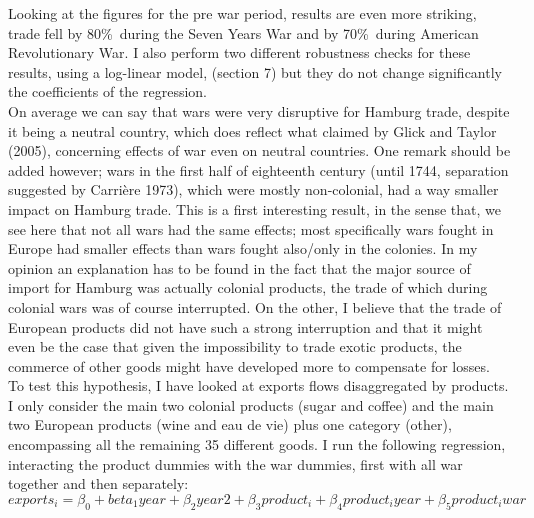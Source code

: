 \documentclass[12pt,a4paper,titlepage]{article}
\begin{document}
Looking at the figures for the pre war period, results are even more striking, trade fell by 80\%\ during the Seven Years War and by 70\%\ during American Revolutionary War. I also perform two different robustness checks for these results, using a log-linear model, (section 7) but they do not change significantly the coefficients of the regression. \\
On average we can say that wars were very disruptive for Hamburg trade, despite it being a neutral country, which does reflect what claimed by Glick and Taylor (2005), concerning effects of war even on neutral countries. One remark should be added however; wars in the first half of eighteenth century (until 1744, separation suggested by Carrière 1973), which were mostly non-colonial, had a way smaller impact on Hamburg trade. This is a first interesting result, in the sense that, we see here that not all wars had the same effects; most specifically wars fought in Europe had smaller effects than wars fought also/only in the colonies. In my opinion an explanation has to be found in the fact that the major source of import for Hamburg was actually colonial products, the trade of which during colonial wars was of course interrupted. On the other, I believe that the trade of European products did not have such a strong interruption and that it might even be the case that given the impossibility to trade exotic products, the commerce of other goods might have developed more to compensate for losses. \\
To test this hypothesis, I have looked at exports flows disaggregated by products. I only consider the main two colonial products (sugar and coffee) and the main two European products (wine and eau de vie) plus one category (other), encompassing all the remaining 35 different goods. I run the following regression, interacting the product dummies with the war dummies, first with all war together and then separately:
\begin{equation}
exports_i=\beta_0+beta_1year+\beta_2year2 + 
\beta_3product_i + \beta_4product_iyear+\beta_5product_iwar
\end{equation}

\end{document}
